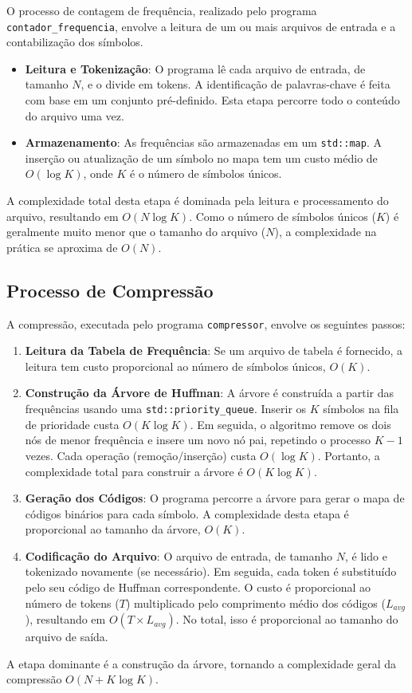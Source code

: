 \documentclass[12pt, a4paper]{article}
\begin{document}
O processo de contagem de frequência, realizado pelo programa \texttt{contador\_frequencia}, envolve a leitura de um ou mais arquivos de entrada e a contabilização dos símbolos.
\begin{itemize}
    \item \textbf{Leitura e Tokenização}: O programa lê cada arquivo de entrada, de tamanho $N$, e o divide em tokens. A identificação de palavras-chave é feita com base em um conjunto pré-definido. Esta etapa percorre todo o conteúdo do arquivo uma vez.
    \item \textbf{Armazenamento}: As frequências são armazenadas em um \texttt{std::map}. A inserção ou atualização de um símbolo no mapa tem um custo médio de $O(\log K)$, onde $K$ é o número de símbolos únicos.
\end{itemize}
A complexidade total desta etapa é dominada pela leitura e processamento do arquivo, resultando em \textbf{$O(N \log K)$}. Como o número de símbolos únicos ($K$) é geralmente muito menor que o tamanho do arquivo ($N$), a complexidade na prática se aproxima de \textbf{$O(N)$}.

\subsection{Processo de Compressão}

A compressão, executada pelo programa \texttt{compressor}, envolve os seguintes passos:
\begin{enumerate}
    \item \textbf{Leitura da Tabela de Frequência}: Se um arquivo de tabela é fornecido, a leitura tem custo proporcional ao número de símbolos únicos, $O(K)$.
    \item \textbf{Construção da Árvore de Huffman}: A árvore é construída a partir das frequências usando uma \texttt{std::priority\_queue}. Inserir os $K$ símbolos na fila de prioridade custa $O(K \log K)$. Em seguida, o algoritmo remove os dois nós de menor frequência e insere um novo nó pai, repetindo o processo $K-1$ vezes. Cada operação (remoção/inserção) custa $O(\log K)$. Portanto, a complexidade total para construir a árvore é \textbf{$O(K \log K)$}.
    \item \textbf{Geração dos Códigos}: O programa percorre a árvore para gerar o mapa de códigos binários para cada símbolo. A complexidade desta etapa é proporcional ao tamanho da árvore, $O(K)$.
    \item \textbf{Codificação do Arquivo}: O arquivo de entrada, de tamanho $N$, é lido e tokenizado novamente (se necessário). Em seguida, cada token é substituído pelo seu código de Huffman correspondente. O custo é proporcional ao número de tokens ($T$) multiplicado pelo comprimento médio dos códigos ($L_{avg}$), resultando em $O(T \times L_{avg})$. No total, isso é proporcional ao tamanho do arquivo de saída.
\end{enumerate}
A etapa dominante é a construção da árvore, tornando a complexidade geral da compressão \textbf{$O(N + K \log K)$}.
\end{document}
